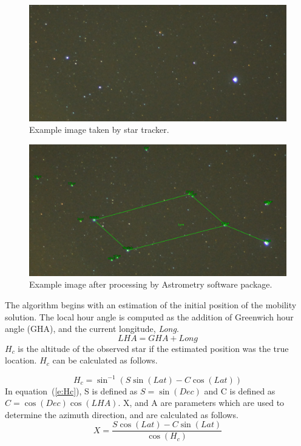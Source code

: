 \documentclass[12pt,a4paper]{book}
\begin{document}
\begin{figure}[!ht]
\centering
\includegraphics[width=12cm]{im60.png}
\caption{Example image taken by star tracker.}
\label{f:im60}
\end{figure}
\begin{figure}[!ht]
\centering
\includegraphics[width=12cm]{im60a.png}
\caption{Example image after processing by Astrometry software package.}
\label{f:im60a}
\end{figure}
\FloatBarrier
The algorithm begins with an estimation of the initial position of the mobility solution. The local hour angle is computed as the addition of Greenwich hour angle (GHA), and the current longitude, \textit{Long}.  
\begin{equation}
 \label{e:LHA}
    LHA = GHA + Long
\end{equation}
$H_{c}$ is the altitude of the observed star if the estimated position was the true location.  $H_{c}$ can be calculated as follows.

\begin{equation}
 \label{e:Hc}
    H_{c} = \sin^{-1}(S\sin(Lat) - C\cos(Lat))
\end{equation}
In equation~(\ref{e:Hc}), S is defined as $S = \sin(Dec)$ and C is defined as $C = \cos(Dec)\cos(LHA)$.
X, and A are parameters which are used to determine the azimuth direction, and are calculated as follows.
\begin{equation}
 \label{e:X}
    X = \frac{S\cos(Lat) - C\sin(Lat)}{\cos(H_{c})}
\end{equation}
\end{document}
